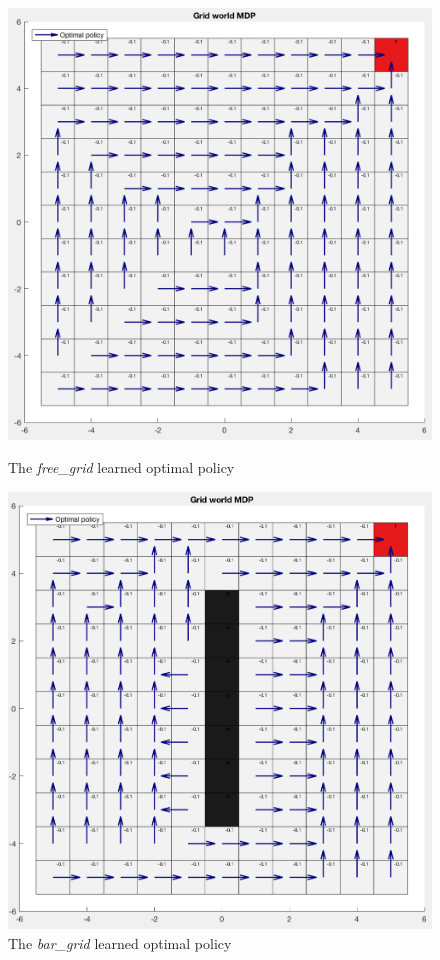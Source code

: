\documentclass[a4paper]{report}
\begin{document}
{{{				\begin{figure}[h!]
				\begin{minipage}{0.45\linewidth}
					\includegraphics[width=\linewidth]{free_grid_bellman_policy}
					\caption{The \emph{free\_grid} learned optimal policy}
				\end{minipage}
				\hfill
				\begin{minipage}{0.45\linewidth}
					\includegraphics[width=\linewidth]{bar_grid_bellman_policy}
					\caption{The \emph{bar\_grid} learned optimal policy}
				\end{minipage}
				\end{figure}
				
}}}
\end{document}
